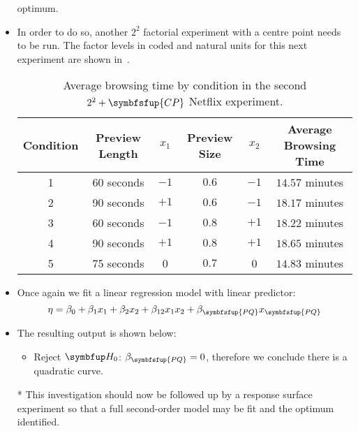 \begin{itemize}
            optimum.
      \item In order to do so, another $2^2$ factorial experiment with a centre point needs to be run. The factor
            levels in coded and natural units for this next experiment are shown in~.
            \begin{table}[!htbp]
                  \centering
                  \caption{Average browsing time by condition in the second $2^2 + \symbfsfup{CP}$ Netflix experiment.}\label{tab:netflixtab3}
                  \begin{tabular}{cccccc}
                        \toprule Condition & Preview Length & $x_{1}$ & Preview Size & $x_{2}$ & Average Browsing Time \\
                        \midrule 1         & 60 seconds     & $-1$    & $0.6$        & $-1$    & $14.57$ minutes       \\
                        2                  & 90 seconds     & $+1$    & $0.6$        & $-1$    & $18.17$ minutes       \\
                        3                  & 60 seconds     & $-1$    & $0.8$        & $+1$    & $18.22$ minutes       \\
                        4                  & 90 seconds     & $+1$    & $0.8$        & $+1$    & $18.65$ minutes       \\
                        5                  & 75 seconds     & 0       & $0.7$        & 0       & $14.83$ minutes       \\
                        \bottomrule
                  \end{tabular}
            \end{table}
      \item Once again we fit a linear regression model with linear predictor:
            \[ \eta=\beta_0+\beta_1x_1+\beta_2x_2+\beta_{12}x_1x_2+\beta_{\symbfsfup{PQ}}x_{\symbfsfup{PQ}} \]
      \item The resulting output is shown below:
            
            \begin{itemize}
                  \item Reject $ \HN $: $ \beta_{\symbfsfup{PQ}}=0 $, therefore we conclude there is a quadratic curve.
            \end{itemize}
      \item[*] This investigation should now be followed up by a response surface experiment so that a full second-order model may be fit and the optimum identified.
\end{itemize}
